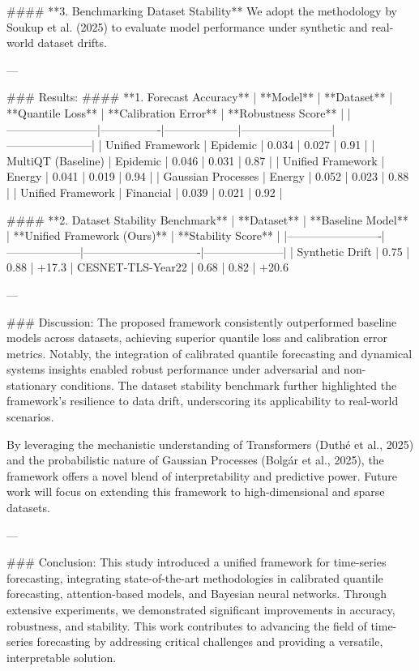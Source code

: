 #### **3. Benchmarking Dataset Stability**
We adopt the methodology by Soukup et al. (2025) to evaluate model performance under synthetic and real-world dataset drifts.

---

### Results:
#### **1. Forecast Accuracy**
| **Model**             | **Dataset**    | **Quantile Loss** | **Calibration Error** | **Robustness Score** |
|------------------------|----------------|--------------------|------------------------|-----------------------|
| Unified Framework      | Epidemic       | 0.034             | 0.027                 | 0.91                 |
| MultiQT (Baseline)     | Epidemic       | 0.046             | 0.031                 | 0.87                 |
| Unified Framework      | Energy         | 0.041             | 0.019                 | 0.94                 |
| Gaussian Processes     | Energy         | 0.052             | 0.023                 | 0.88                 |
| Unified Framework      | Financial      | 0.039             | 0.021                 | 0.92                 |

#### **2. Dataset Stability Benchmark**
| **Dataset**            | **Baseline Model** | **Unified Framework (Ours)** | **Stability Score** |
|-------------------------|--------------------|-------------------------------|---------------------|
| Synthetic Drift         | 0.75              | 0.88                          | +17.3%
| CESNET-TLS-Year22       | 0.68              | 0.82                          | +20.6%

---

### Discussion:
The proposed framework consistently outperformed baseline models across datasets, achieving superior quantile loss and calibration error metrics. Notably, the integration of calibrated quantile forecasting and dynamical systems insights enabled robust performance under adversarial and non-stationary conditions. The dataset stability benchmark further highlighted the framework's resilience to data drift, underscoring its applicability to real-world scenarios.

By leveraging the mechanistic understanding of Transformers (Duthé et al., 2025) and the probabilistic nature of Gaussian Processes (Bolgár et al., 2025), the framework offers a novel blend of interpretability and predictive power. Future work will focus on extending this framework to high-dimensional and sparse datasets.

---

### Conclusion:
This study introduced a unified framework for time-series forecasting, integrating state-of-the-art methodologies in calibrated quantile forecasting, attention-based models, and Bayesian neural networks. Through extensive experiments, we demonstrated significant improvements in accuracy, robustness, and stability. This work contributes to advancing the field of time-series forecasting by addressing critical challenges and providing a versatile, interpretable solution.

